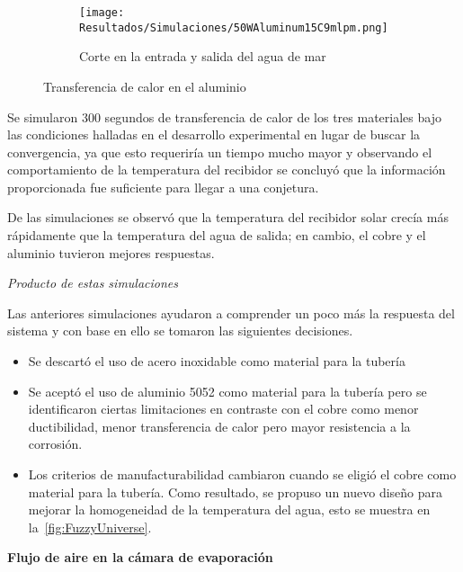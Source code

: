 				\begin{figure}[H]\ContinuedFloat
					\begin{subfigure}[t]{\linewidth}
						\centering
						\texttt{[image: Resultados/Simulaciones/50WAluminum15C9mlpm.png]}
						\caption{Corte en la entrada y salida del agua de mar}
						\label{fig:50WAluminum15C9mlpm}
					\end{subfigure}
					\hfill
					\caption{Transferencia de calor en el aluminio}
					\label{fig:aluminum-heat-transfer}
				\end{figure}
				
				Se simularon 300 segundos de transferencia de calor de los tres materiales bajo las condiciones halladas en el desarrollo experimental en lugar de buscar la convergencia, ya que esto requeriría un tiempo mucho mayor y observando el comportamiento de la temperatura del recibidor se concluyó que la información proporcionada fue suficiente para llegar a una conjetura.
				
				De las simulaciones se observó que la temperatura del recibidor solar crecía más rápidamente que la temperatura del agua de salida; en cambio, el cobre y el aluminio tuvieron mejores respuestas.
				
				\textit{Producto de estas simulaciones}
				
				Las anteriores simulaciones ayudaron a comprender un poco más la respuesta del sistema y con base en ello se tomaron las siguientes decisiones.
				
				\begin{itemize}
					\item Se descartó el uso de acero inoxidable como material para la tubería
					\item Se aceptó el uso de aluminio 5052 como material para la tubería pero se identificaron ciertas limitaciones en contraste con el cobre como menor ductibilidad, menor transferencia de calor pero mayor resistencia a la corrosión.
					\item Los criterios de manufacturabilidad cambiaron cuando se eligió el cobre como material para la tubería. Como resultado, se propuso un nuevo diseño para mejorar la homogeneidad de la temperatura del agua, esto se muestra en la~\cref{fig:FuzzyUniverse}.
				\end{itemize}
				
				
				\textbf{Flujo de aire en la cámara de evaporación}\par
			
